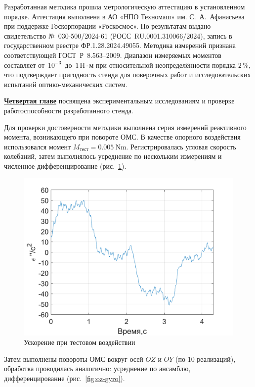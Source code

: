 Разработанная методика прошла метрологическую аттестацию
в установленном порядке. Аттестация выполнена в АО «НПО Техномаш»
им. С.~А.~Афанасьева при поддержке Госкорпорации «Роскосмос».
По результатам выдано свидетельство №~030-500/2024-61
(РОСС~RU.0001.310066/2024), запись в государственном реестре
ФР.1.28.2024.49055. Методика измерений признана соответствующей
ГОСТ~Р~8.563–2009. Диапазон измеряемых моментов составляет
от~$10^{-3}$~до~$1\,\text{Н}\cdot\text{м}$ при относительной
неопределённости порядка $2\,\%$, что подтверждает пригодность стенда
для поверочных работ и исследовательских испытаний оптико-механических систем.

\underline{\textbf{Четвертая главе}} посвящена экспериментальным исследованиям и проверке работоспособности разработанного стенда.

Для проверки достоверности методики выполнена серия измерений реактивного момента, возникающего при повороте ОМС. В качестве опорного воздействия использовался момент $M_{\text{тест}}=\SI{0.005}{\newton\meter}$. Регистрировалась угловая скорость колебаний, затем выполнялось усреднение по нескольким измерениям и численное дифференцирование (рис.~\cref{fig:test-gyro-acc}).

\begin{figure}[h!]
	\centering
	\includegraphics[scale=0.45]{matlab/img/test-gyro-acc}
	\caption{Ускорение при тестовом воздействии}
	\label{fig:test-gyro-acc}
\end{figure}

Затем выполнены повороты ОМС вокруг осей $OZ$ и $OY$ (по 10 реализаций), обработка проводилась аналогично:
усреднение по ансамблю, дифференцирование
(рис.~\cref{fig:oz-gyro}).

